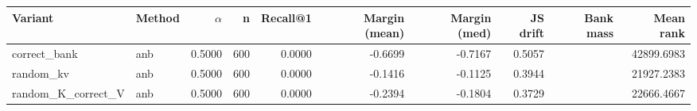 \begin{tabular}{l l r r r r r r r r}
\toprule
Variant & Method & $\alpha$ & n & Recall@1 & Margin (mean) & Margin (med) & JS drift & Bank mass & Mean rank \\
\midrule
correct\_bank & anb & 0.5000 & 600 & 0.0000 & -0.6699 & -0.7167 & 0.5057 &  & 42899.6983 \\
random\_kv & anb & 0.5000 & 600 & 0.0000 & -0.1416 & -0.1125 & 0.3944 &  & 21927.2383 \\
random\_K\_correct\_V & anb & 0.5000 & 600 & 0.0000 & -0.2394 & -0.1804 & 0.3729 &  & 22666.4667 \\
\bottomrule
\end{tabular}
